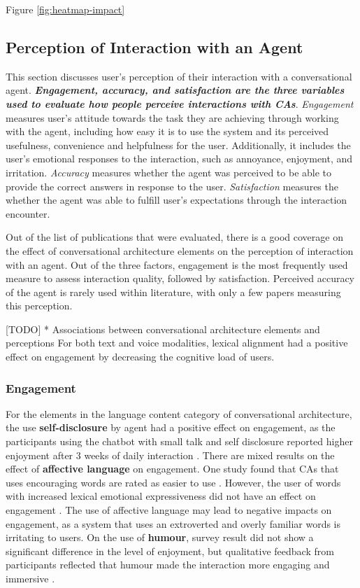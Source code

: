 \documentclass[sigconf,screen,review, anonymous]{acmart}
\newcommand{\cmt}[1]{}%
\begin{document}
Figure \ref{fig:heatmap-impact}


\subsection{Perception of Interaction with an Agent}

This section discusses user's perception of their interaction with a conversational agent. \textbf{\textit{Engagement, accuracy, and satisfaction are the three variables used to evaluate how people perceive interactions with CAs}}. \textit{Engagement} measures user's attitude towards the task they are achieving through working with the agent, including how easy it is to use the system and its perceived usefulness, convenience and helpfulness for the user. Additionally, it includes the user's emotional responses to the interaction, such as annoyance, enjoyment, and irritation. \textit{Accuracy} measures whether the agent was perceived to be able to provide the correct answers in response to the user. \textit{Satisfaction} measures the whether the agent was able to fulfill user's expectations through the interaction encounter.

Out of the list of publications that were evaluated, there is a good coverage on the effect of conversational architecture elements on the perception of interaction with an agent. Out of the three factors, engagement is the most frequently used measure to assess interaction quality, followed by satisfaction. Perceived accuracy of the agent is rarely used within literature, with only a few papers measuring this perception. 

[TODO] * Associations between conversational architecture elements and perceptions
For both text and voice modalities, lexical alignment had a positive effect on engagement by decreasing the cognitive load of users. 

\subsubsection{Engagement}
For the elements in the language content category of conversational architecture, the use \textbf{self-disclosure} by agent had a positive effect on engagement, as the participants using the chatbot with small talk and self disclosure reported higher enjoyment after 3 weeks of daily interaction \cite{lee2020hear}\cmt{[23]}. There are mixed results on the effect of \textbf{affective language} on engagement. One study found that CAs that uses encouraging words are rated as easier to use \cite{healey2013relating}\cmt{[39]}. However, the user of words with increased lexical emotional expressiveness did not have an effect on engagement \cite{zhu2022effects}\cmt{[26]}. The use of affective language may lead to negative impacts on engagement, as a system that uses an extroverted and overly familiar words is irritating to users. On the use of \textbf{humour}, survey result did not show a significant difference in the level of enjoyment, but qualitative feedback from participants reflected that humour made the interaction more engaging and immersive \cite{ceha2021can}\cmt{[57]}.
\end{document}

